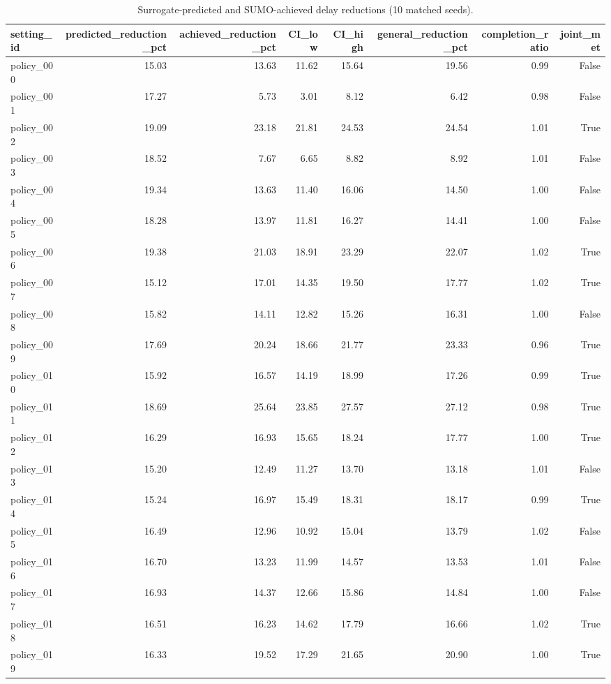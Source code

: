 \begin{table}[!htbp]
\centering
\small
\caption{Surrogate-predicted and SUMO-achieved delay reductions (10 matched seeds).}
\label{tab:recourse}
\begin{tabular}{lrrrrrrr}
\toprule
setting\_id & predicted\_reduction\_pct & achieved\_reduction\_pct & CI\_low & CI\_high & general\_reduction\_pct & completion\_ratio & joint\_met \\
\midrule
policy\_000 & 15.03 & 13.63 & 11.62 & 15.64 & 19.56 & 0.99 & False \\
policy\_001 & 17.27 & 5.73 & 3.01 & 8.12 & 6.42 & 0.98 & False \\
policy\_002 & 19.09 & 23.18 & 21.81 & 24.53 & 24.54 & 1.01 & True \\
policy\_003 & 18.52 & 7.67 & 6.65 & 8.82 & 8.92 & 1.01 & False \\
policy\_004 & 19.34 & 13.63 & 11.40 & 16.06 & 14.50 & 1.00 & False \\
policy\_005 & 18.28 & 13.97 & 11.81 & 16.27 & 14.41 & 1.00 & False \\
policy\_006 & 19.38 & 21.03 & 18.91 & 23.29 & 22.07 & 1.02 & True \\
policy\_007 & 15.12 & 17.01 & 14.35 & 19.50 & 17.77 & 1.02 & True \\
policy\_008 & 15.82 & 14.11 & 12.82 & 15.26 & 16.31 & 1.00 & False \\
policy\_009 & 17.69 & 20.24 & 18.66 & 21.77 & 23.33 & 0.96 & True \\
policy\_010 & 15.92 & 16.57 & 14.19 & 18.99 & 17.26 & 0.99 & True \\
policy\_011 & 18.69 & 25.64 & 23.85 & 27.57 & 27.12 & 0.98 & True \\
policy\_012 & 16.29 & 16.93 & 15.65 & 18.24 & 17.77 & 1.00 & True \\
policy\_013 & 15.20 & 12.49 & 11.27 & 13.70 & 13.18 & 1.01 & False \\
policy\_014 & 15.24 & 16.97 & 15.49 & 18.31 & 18.17 & 0.99 & True \\
policy\_015 & 16.49 & 12.96 & 10.92 & 15.04 & 13.79 & 1.02 & False \\
policy\_016 & 16.70 & 13.23 & 11.99 & 14.57 & 13.53 & 1.01 & False \\
policy\_017 & 16.93 & 14.37 & 12.66 & 15.86 & 14.84 & 1.00 & False \\
policy\_018 & 16.51 & 16.23 & 14.62 & 17.79 & 16.66 & 1.02 & True \\
policy\_019 & 16.33 & 19.52 & 17.29 & 21.65 & 20.90 & 1.00 & True \\
\bottomrule
\end{tabular}
\end{table}
